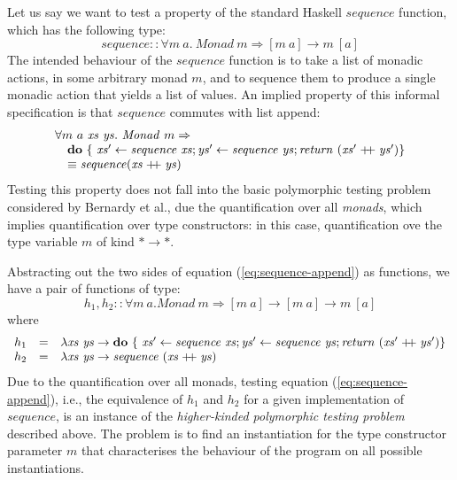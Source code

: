 \documentclass{llncs}
\newcommand{\listappend}{\mathrel{+\kern-3pt+}}
\begin{document}

Let us say we want to test a property of the standard Haskell
$\mathit{sequence}$ function, which has the following type:
\begin{displaymath}
  \mathit{sequence} :: \forall m~a.~\mathit{Monad}~m \Rightarrow [m~a] \to m~[a]
\end{displaymath}
The intended behaviour of the $\mathit{sequence}$ function is to take
a list of monadic actions, in some arbitrary monad $m$, and to
sequence them to produce a single monadic action that yields a list of
values. An implied property of this informal specification is that
$\mathit{sequence}$ commutes with list append:
\begin{equation}\label{eq:sequence-append}
  \begin{array}{l}
    \forall m~a~\mathit{xs}~\mathit{ys}.~\mathit{Monad}~m \Rightarrow \\
    \quad \mathbf{do}~\{~\mathit{xs'} \leftarrow \mathit{sequence}~\mathit{xs}; \mathit{ys'} \leftarrow \mathit{sequence}~\mathit{ys}; \mathit{return}~(\mathit{xs'}\listappend\mathit{ys'}) \} \\
    \quad \equiv \mathit{sequence} (\mathit{xs}\listappend\mathit{ys})
  \end{array}
\end{equation}
Testing this property does not fall into the basic polymorphic testing
problem considered by Bernardy et al., due the quantification over all
\emph{monads}, which implies quantification over type constructors: in
this case, quantification ove the type variable $m$ of kind $* \to *$.

Abstracting out the two sides of equation (\ref{eq:sequence-append})
as functions, we have a pair of functions of type:
\begin{displaymath}
  h_1, h_2 :: \forall m~a. \mathit{Monad}~m \Rightarrow [m~a] \to [m~a] \to m~[a]
\end{displaymath}
where
\begin{displaymath}
  \begin{array}{lcl}
    h_1&=&\lambda \mathit{xs}~\mathit{ys} \to \mathbf{do}~\{~\mathit{xs'} \leftarrow \mathit{sequence}~\mathit{xs}; \mathit{ys'} \leftarrow \mathit{sequence}~\mathit{ys}; \mathit{return}~(\mathit{xs'}\listappend\mathit{ys'}) \} \\
    h_2&=&\lambda \mathit{xs}~\mathit{ys} \to \mathit{sequence}~(\mathit{xs}\listappend\mathit{ys})
  \end{array}
\end{displaymath}
Due to the quantification over all monads, testing equation
(\ref{eq:sequence-append}), i.e., the equivalence of $h_1$ and $h_2$
for a given implementation of $\mathit{sequence}$, is an instance of
the \emph{higher-kinded polymorphic testing problem} described
above. %
The problem is to find an instantiation for the type constructor
parameter $m$ that characterises the behaviour of the program on all
possible instantiations.
\end{document}
